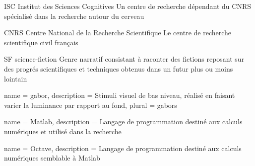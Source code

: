   {ISC}
  {Institut des Sciences Cognitives}
  {Un centre de recherche dépendant du \gls{CNRS} spécialisé dans la recherche autour du cerveau}

  {CNRS}
  {Centre National de la Recherche Scientifique}
  {Le centre de recherche scientifique civil français}

  {SF}
  {science-fiction}
  {Genre narratif consistant à raconter des fictions reposant sur des progrés scientifiques et techniques obtenus dans un futur plus ou moins lointain}

 {
  name = gabor,
  description = {Stimuli visuel de bas niveau, réalisé en faisant varier la luminance par rapport au fond},
  plural = gabors
}


 {
  name = Matlab,
  description = {Langage de programmation destiné aux calculs numériques et utilisé dans la recherche}
}

 {
  name = Octave,
  description = {Langage de programmation destiné aux calculs numériques semblable à \gls{Matlab}}
}